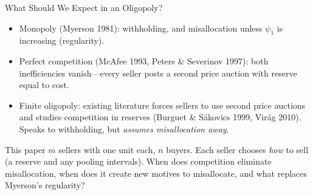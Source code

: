 \documentclass[11pt,aspectratio=169,handout]{beamer}
\def\meditem{\smallskip\item}
\begin{document}
\begin{frame}{What Should We Expect in an Oligopoly?}
\begin{itemize}
\item \alert{Monopoly} (Myerson 1981): withholding, and misallocation unless $\psi_1$ is increasing (regularity).
\meditem \alert{Perfect competition} (McAfee 1993, Peters \& Severinov 1997): both inefficiencies vanish---every seller posts a second price auction with reserve equal to cost.
\meditem \alert{Finite oligopoly}: existing literature forces sellers to use second price auctions and studies competition in reserves (Burguet \& S\'akovics 1999, Vir\'ag 2010). Speaks to withholding, but \emph{assumes misallocation away}.
\end{itemize}

\medskip{}
\begin{block}{This paper}
$m$ sellers with one unit each, $n$ buyers. Each seller chooses \emph{how} to sell (a reserve and any pooling intervals). When does competition eliminate misallocation, when does it create new motives to misallocate, and what replaces Myerson's regularity?
\end{block}
\end{frame}
\end{document}
